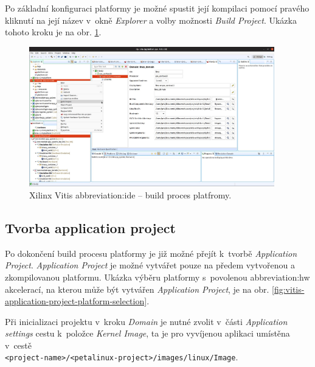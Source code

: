 \documentclass[a4paper, twoside, 11pt]{article}
\newcommand{\fbar}{\FloatBarrier}
\begin{document}
		Po základní konfiguraci platformy je možné spustit její kompilaci pomocí pravého kliknutí na její název v~okně \textit{Explorer} a volby možnosti \textit{Build Project}. Ukázka tohoto kroku je na obr. \ref{fig:vitis-platform-build}.
		\begin{figure}[htbp!]
			\centering
			\includegraphics[width=0.95\textwidth]{src/jpg/vitis-build-project-platform.jpg}
			\caption{Xilinx Vitis \gls{abbreviation:ide} – build proces platfromy.}
			\label{fig:vitis-platform-build}
		\end{figure}

		\fbar
		\subsection{Tvorba application project}
		Po dokončení build procesu platformy je již možné přejít k~tvorbě \textit{Application Project}. \textit{Application Project} je možné vytvářet pouze na předem vytvořenou a zkompilovanou platformu. Ukázka výběru platformy s~povolenou \gls{abbreviation:hw} akcelerací, na kterou může být vytvářen \textit{Application Project}, je na obr. \ref{fig:vitis-application-project-platform-selection}.\par
		Při inicializaci projektu v~kroku \textit{Domain} je nutné zvolit v~části \textit{Application settings} cestu k~položce \textit{Kernel Image}, ta je pro vyvíjenou aplikaci umístěna v~cestě\\\texttt{<project-name>/<petalinux-project>/images/linux/Image}.
\end{document}
